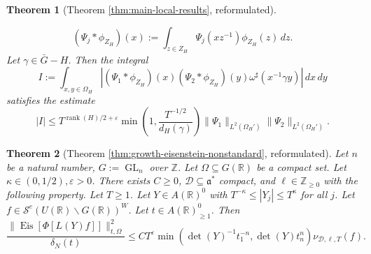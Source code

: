 \documentclass[reqno]{amsart}
\DeclareMathOperator{\GL}{GL}
\def\eps{\varepsilon}
\DeclareMathOperator{\rank}{rank}
\DeclareMathOperator{\Eis}{Eis}
\theoremstyle{plain} \newtheorem{theorem} {Theorem}
\theoremstyle{definition} \newtheorem{definition} [theorem] {Definition}
\theoremstyle{itplain} %
\numberwithin{equation}{section}
\numberwithin{theorem}{section}
\renewcommand{\geq}{\geqslant}
\renewcommand{\leq}{\leqslant}
\begin{document}
\begin{theorem}[Theorem \ref{thm:main-local-results}, reformulated]
\begin{enumerate}[(i)]
  \begin{equation*}
(\Psi_j \ast \phi_{Z_H})(x) := \int _{z \in Z_H} \Psi_j(x z^{-1}) \phi_{Z_H}(z) \, d z.
\end{equation*}
  Let $\gamma \in \bar{G} - H$.  Then the integral
    \begin{equation*}
      I := \int _{x, y \in \Omega_H }
    \left\lvert
      (\Psi_1 \ast \phi_{Z_H})(x)
      (\Psi_2 \ast \phi_{Z_H})(y)
      \omega^\sharp(x^{-1} \gamma y)
    \right\rvert
    \, d x \, d y
  \end{equation*}
  satisfies the estimate
  \begin{equation*}
    |I| \leq
  T^{\rank(H)/2 + \eps}
  \min\left( 1,
    \frac{T^{-1/2}}{ d_H(\gamma)}
  \right)
    \|\Psi_1\|_{L^2(\Omega_H')}
    \|\Psi_2\|_{L^2(\Omega_H')}.
  \end{equation*}
\end{enumerate}
\end{theorem}




\begin{theorem}[Theorem \ref{thm:growth-eisenstein-nonstandard}, reformulated]
  Let $n$ be a natural number, $G := \GL_n$ over $\mathbb{Z}$.  Let $\Omega \subseteq G(\mathbb{R})$ be a compact set.  Let $\kappa \in (0, 1/2), \eps > 0$.  There exists $C \geq 0$, $\mathcal{D} \subseteq \mathfrak{a}^*$ compact, and $\ell \in \mathbb{Z}_{\geq 0}$ with the following property.  Let $T \geq 1$.  Let $Y \in A(\mathbb{R})^0$ with $T^{-\kappa} \leq |Y_j| \leq T^{\kappa}$ for all $j$.  Let $f \in \mathcal{S}^e(U(\mathbb{R}) \backslash G(\mathbb{R}))^W$.  Let $t \in A(\mathbb{R})^0_{\geq 1}$.  Then
  \begin{equation*}
    \frac{\|\Eis [ \Phi[L(Y) f] ] \|_{t,\Omega}^2}{\delta_N(t)}
    \leq C T^\eps \min \left( \det(Y)^{-1} t_1^{-n}, \det(Y) t_n^n \right) \nu_{\mathcal{D},\ell,T}(f).
  \end{equation*}
\end{theorem}
\end{document}
